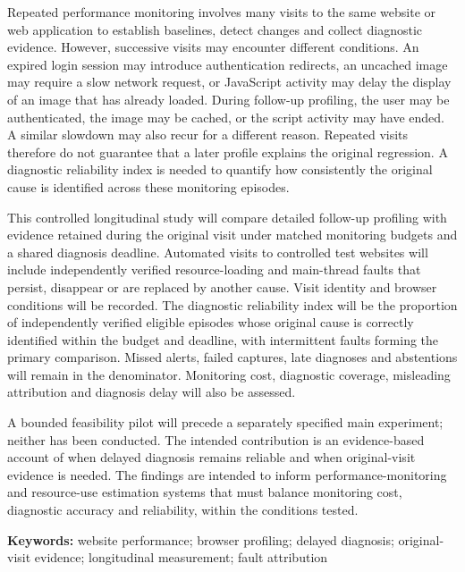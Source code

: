 
Repeated performance monitoring involves many visits to the same website or web application to establish baselines, detect changes and collect diagnostic evidence. However, successive visits may encounter different conditions. An expired login session may introduce authentication redirects, an uncached image may require a slow network request, or JavaScript activity may delay the display of an image that has already loaded. During follow-up profiling, the user may be authenticated, the image may be cached, or the script activity may have ended. A similar slowdown may also recur for a different reason. Repeated visits therefore do not guarantee that a later profile explains the original regression. A diagnostic reliability index is needed to quantify how consistently the original cause is identified across these monitoring episodes.

This controlled longitudinal study will compare detailed follow-up profiling with evidence retained during the original visit under matched monitoring budgets and a shared diagnosis deadline. Automated visits to controlled test websites will include independently verified resource-loading and main-thread faults that persist, disappear or are replaced by another cause. Visit identity and browser conditions will be recorded. The diagnostic reliability index will be the proportion of independently verified eligible episodes whose original cause is correctly identified within the budget and deadline, with intermittent faults forming the primary comparison. Missed alerts, failed captures, late diagnoses and abstentions will remain in the denominator. Monitoring cost, diagnostic coverage, misleading attribution and diagnosis delay will also be assessed.

A bounded feasibility pilot will precede a separately specified main experiment; neither has been conducted. The intended contribution is an evidence-based account of when delayed diagnosis remains reliable and when original-visit evidence is needed. The findings are intended to inform performance-monitoring and resource-use estimation systems that must balance monitoring cost, diagnostic accuracy and reliability, within the conditions tested.

\noindent\textbf{Keywords:} website performance; browser profiling; delayed diagnosis; original-visit evidence; longitudinal measurement; fault attribution
